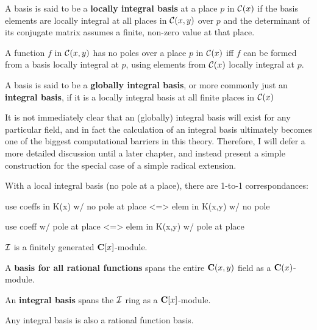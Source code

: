 


A basis is said to be a {\bf locally integral basis} at a place $p$ in
${\cal C}(x)$ if the basis elements are locally integral at all places
in ${\cal C}(x,y)$ over $p$ and the determinant of its conjugate
matrix assumes a finite, non-zero value at that place.

\enddefinition

\theorem

A function $f$ in ${\cal C}(x,y)$ has no poles over a place $p$ in
${\cal C}(x)$ iff $f$ can be formed from a basis locally integral at
$p$, using elements from ${\cal C}(x)$ locally integral at $p$.

\endtheorem


A basis is said to be a {\bf globally integral basis}, or more commonly
just an {\bf integral basis}, if it is a locally integral basis at
all finite places in ${\cal C}(x)$

\enddefinition

It is not immediately clear that an (globally) integral basis will
exist for any particular field, and in fact the calculation of an
integral basis ultimately becomes one of the biggest computational
barriers in this theory.  Therefore, I will defer a more detailed
discussion until a later chapter, and instead present a simple
construction for the special case of a simple radical extension.

With a local integral basis (no pole at a place), there are 1-to-1
correspondances:

	use coeffs in K(x) w/ no pole at place <=> elem in K(x,y) w/ no pole

	use coeff w/ pole at place <=> elem in K(x,y) w/ pole at place


\theorem

${\cal I}$ is a finitely generated ${\bf C}[x]$-module.

\endtheorem


A {\bf basis for all
rational functions} spans the entire ${\bf C}(x,y)$ field
as a ${\bf C}(x)$-module.

\enddefinition


An {\bf integral basis} spans the ${\cal I}$ ring
as a ${\bf C}[x]$-module.

\enddefinition

\theorem

Any integral basis is also a rational function basis.

\endtheorem

